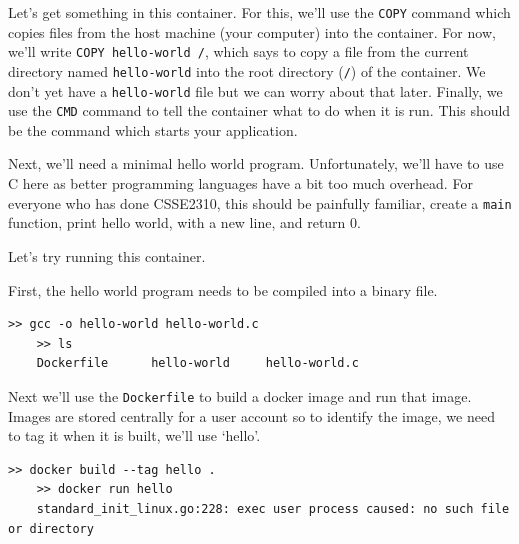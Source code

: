 \documentclass{csse4400}
\begin{document}
Let's get something in this container.
For this, we'll use the \texttt{COPY} command which copies files from the host machine (your computer) into the container.
For now, we'll write \texttt{COPY hello-world /}, which says to copy a file from the current directory named \texttt{hello-world} into the root directory (\texttt{/})
of the container.
We don't yet have a \texttt{hello-world} file but we can worry about that later.
Finally, we use the \texttt{CMD} command to tell the container what to do when it is run.
This should be the command which starts your application.

\begin{shaded*}

\end{shaded*}


Next, we'll need a minimal hello world program.
Unfortunately, we'll have to use C here as better programming languages have a bit too much overhead.
For everyone who has done CSSE2310, this should be painfully familiar, create a \texttt{main} function, print hello world, with a new line, and return 0.

\begin{shaded*}

\end{shaded*}

Let's try running this container.

First, the hello world program needs to be compiled into a binary file.

\begin{shaded*}
\begin{lstlisting}[language=shell]
    >> gcc -o hello-world hello-world.c
    >> ls
    Dockerfile      hello-world     hello-world.c
\end{lstlisting}
\end{shaded*}

Next we'll use the \texttt{Dockerfile} to build a docker image and run that image.
Images are stored centrally for a user account so to identify the image, we need to tag it when it is built, we'll use `hello'.

\begin{shaded*}
\begin{lstlisting}[language=shell]
    >> docker build --tag hello .
    >> docker run hello
    standard_init_linux.go:228: exec user process caused: no such file or directory
\end{lstlisting}
\end{shaded*}
\end{document}
